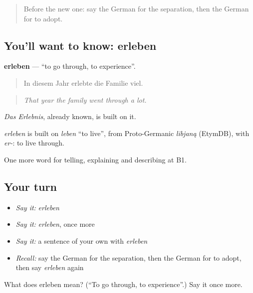 \label{lesson:GE-C300-erleben}



\begin{quote}
Before the new one: say the German for the separation, then the German for to adopt.
\end{quote}

\subsection*{You'll want to know: erleben}
\textbf{erleben} — \textquotedblleft{}to go through, to experience\textquotedblright{}.

\begin{quote}
In diesem Jahr erlebte die Familie viel.
\end{quote}

\begin{quote}
\emph{That year the family went through a lot.}
\end{quote}

\emph{Das Erlebnis}, already known, is built on it.

\begin{cousinweb}
\emph{erleben} is built on \emph{leben} \textquotedblleft{}to live\textquotedblright{}, from Proto-Germanic \emph{libjaną} (EtymDB), with \emph{er-}: to live through.
\end{cousinweb}

\begin{grammarlens}[title={What you've built}]
One more word for telling, explaining and describing at B1.
\end{grammarlens}

\subsection*{Your turn}
\begin{itemize}
\raggedright
  \item \emph{Say it:} \emph{erleben}
  \item \emph{Say it:} \emph{erleben}, once more
  \item \emph{Say it:} a sentence of your own with \emph{erleben}
  \item \emph{Recall:} say the German for the separation, then the German for to adopt, then say \emph{erleben} again
\end{itemize}

\begin{tcolorbox}[breakable,colback=teal!4,colframe=teal!35!black,title={Before you move on}]
What does erleben mean? (\textquotedblleft{}To go through, to experience\textquotedblright{}.) Say it once more.
\end{tcolorbox}
